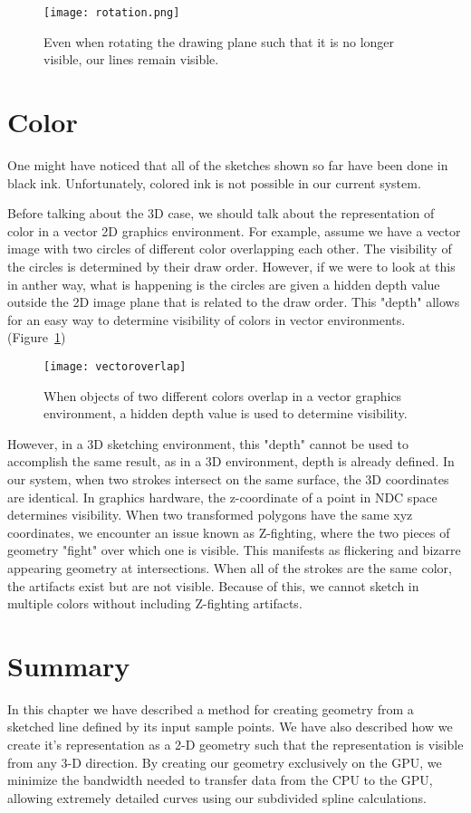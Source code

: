 \begin{figure}
\begin{center}
\texttt{[image: rotation.png]}
\caption{Even when rotating the drawing plane such that it is no longer visible, our lines remain visible.}
\end{center}
\end{figure}

\section{Color}

\label{sec:3dcolor}
One might have noticed that all of the sketches shown so far have been done in black ink.
Unfortunately, colored ink is not possible in our current system.

Before talking about the 3D case, we should talk about the representation of color in a vector 2D graphics environment.
For example, assume we have a vector image with two circles of different color overlapping each other.
The visibility of the circles is determined by their draw order.
However, if we were to look at this in anther way, what is happening is the circles are given a hidden depth value outside the 2D image plane that is related to the draw order.
This "depth" allows for an easy way to determine visibility of colors in vector environments. (Figure~\ref{fig:vecoverlap})

\begin{figure}
\texttt{[image: vectoroverlap]}
\caption[Overlapping Colored Objects in 2D Vector Graphics]{When objects of two different colors overlap in a vector graphics environment, a hidden depth value is used to determine visibility.}
\label{fig:vecoverlap}
\end{figure}

However, in a 3D sketching environment, this "depth" cannot be used to accomplish the same result, as in a 3D environment, depth is already defined.
In our system, when two strokes intersect on the same surface, the 3D coordinates are identical.
In graphics hardware, the z-coordinate of a point in NDC space determines visibility.
When two transformed polygons have the same xyz coordinates, we encounter an issue known as Z-fighting, where the two pieces of geometry "fight" over which one is visible.
This manifests as flickering and bizarre appearing geometry at intersections.
When all of the strokes are the same color, the artifacts exist but are not visible.
Because of this, we cannot sketch in multiple colors without including Z-fighting artifacts.

\section{Summary}

In this chapter we have described a method for creating geometry from a sketched line defined by its input sample points.
We have also described how we create it's representation as a 2-D geometry such that the representation is visible from any 3-D direction.
By creating our geometry exclusively on the GPU, we minimize the bandwidth needed to transfer data from the CPU to the GPU, allowing extremely detailed curves using our subdivided spline calculations.